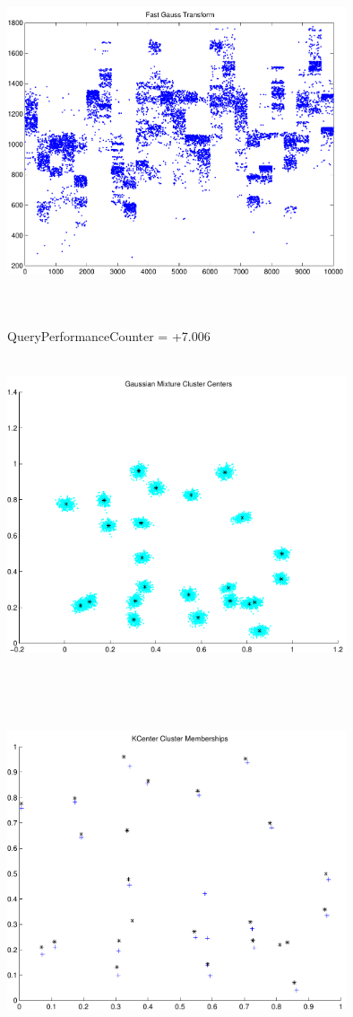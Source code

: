 \documentclass[9pt]{article}
\theoremstyle{plain}
\theoremstyle{definition}
\theoremstyle{remark}
\numberwithin{equation}{section}
\begin{document}
\includegraphics[width=10.0cm,height=10.0cm]{FGT25_Centers.pdf}

QueryPerformanceCounter  =  +7.006
\includegraphics[width=10.0cm,height=10.0cm]{GaussianMixture_ClusterCenters24_Centers.pdf}

\includegraphics[width=10.0cm,height=10.0cm]{KCenterClusterMemberships_24_Centers.pdf}
\end{document}
